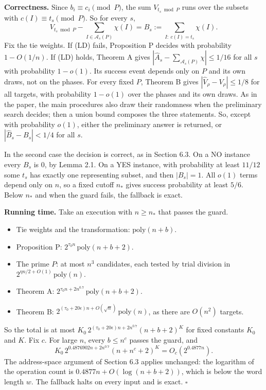 \documentclass[10pt,a4paper]{article}
\begin{document}
\textbf{Correctness.} Since $b_i \equiv c_i \pmod P$, the sum $V_{t_s\bmod P}$ runs over the subsets with
$c(I) \equiv t_s \pmod P$. So for every $s$,
\[V_{t_s\bmod P} - \sum_{I\in\mathcal A_s(P)}\chi(I) = B_s := \sum_{I:\ c(I) = t_s}\chi(I).\]
Fix the tie weights. If (LD) fails, Proposition P decides with probability $1 - O(1/n)$. If (LD) holds, Theorem A gives
$|\hat A_s - \sum_{\mathcal A_s(P)}\chi| \le 1/16$ for all $s$ with probability $1 - o(1)$. Its success event depends only
on $P$ and its own draws, not on the phases. For every fixed $P$, Theorem B gives $|\hat V_\rho - V_\rho| \le 1/8$ for all
targets, with probability $1 - o(1)$ over the phases and its own draws. As in the paper, the main procedures also draw
their randomness when the preliminary search decides; then a union bound composes the three statements. So, except with
probability $o(1)$, either the preliminary answer is returned, or $|\hat B_s - B_s| < 1/4$ for all $s$.

In the second case the decision is correct, as in Section 6.3. On a NO instance every $B_s$ is $0$, by Lemma 2.1. On a
YES instance, with probability at least $11/12$ some $t_s$ has exactly one representing subset, and then $|B_s| = 1$. All
$o(1)$ terms depend only on $n$, so a fixed cutoff $n_*$ gives success probability at least $5/6$. Below $n_*$ and when the
guard fails, the fallback is exact.

\textbf{Running time.} Take an execution with $n \ge n_*$ that passes the guard.

\begin{itemize}
\item Tie weights and the transformation: $\mathrm{poly}(n+b)$.
\item Proposition P: $2^{\tau_0 n}\,\mathrm{poly}(n+b+2)$.
\item The prime $P$: at most $n^3$ candidates, each tested by trial division in $2^{\eta n/2 + O(1)}\,\mathrm{poly}(n)$.
\item Theorem A: $2^{\tau_0 n + 2n^{0.7}}\,\mathrm{poly}(n+b+2)$.
\item Theorem B: $2^{(\tau_0 + 20\epsilon)n + O(\sqrt n)}\,\mathrm{poly}(n)$, as there are $O(n^2)$ targets.
\end{itemize}

So the total is at most $K_0\,2^{(\tau_0 + 20\epsilon)n + 2n^{0.7}}(n+b+2)^K$ for fixed constants $K_0$ and $K$. Fix $c$.
For large $n$, every $b \le n^c$ passes the guard, and
\[K_0\,2^{0.4876902n + 2n^{0.7}}(n + n^c + 2)^K = O_c(2^{0.4877n}).\]
The address-space argument of Section 6.3 applies unchanged: the logarithm of the operation count is
$0.4877n + O(\log(n+b+2))$, which is below the word length $w$. The fallback halts on every input and is exact. $\square$
\end{document}
